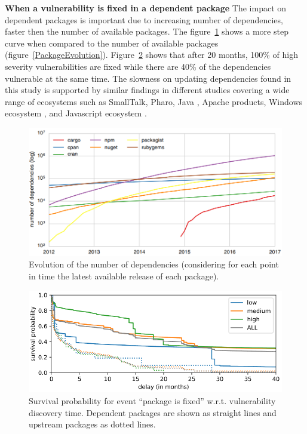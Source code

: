 \documentclass[pdf,bookmarks,colorlinks=true]{IEEEtran}
\begin{document}
\textbf{When a vulnerability is fixed in a dependent package}
The impact on dependent packages is important due to increasing number of dependencies, faster then the number of available packages. The figure~\ref{DependenciesGrowing} shows a more step curve when compared to the number of available packages (figure~\ref{PackageEvolution}). 
Figure~\ref{WhenIsFixedDependentPackages} shows that after 20 months, 100\% of  high severity vulnerabilities are fixed while there are 40\% of the dependencies vulnerable at the same time. The slowness on updating dependencies found in this study is supported by similar findings in different studies covering a wide range of ecosystems such as SmallTalk\cite{Robbes:2012:DRA:2393596.2393662}, Pharo\cite{7332471}, Java \cite{7816485}, Apache products\cite{Bavota2015}, Windows ecosystem \cite{7163055}, and Javascript ecosystem \cite{Lauinger}.

\begin{figure}[h]
	\centering
	\includegraphics[scale=0.40]{DependenciesGrowing.png}
	\caption{Evolution of the number of dependencies (considering for each point in time the latest available
		release of each package).}
	\label{DependenciesGrowing}
\end{figure}

\begin{figure}[h]
	\centering
	\includegraphics[scale=0.40]{WhenIsFixedDependentPackages.png}
	\caption{Survival probability for event “package is fixed” w.r.t. vulnerability discovery time. Dependent packages are
		shown as straight lines and upstream packages as dotted lines.}
	\label{WhenIsFixedDependentPackages}
\end{figure}
\end{document}
